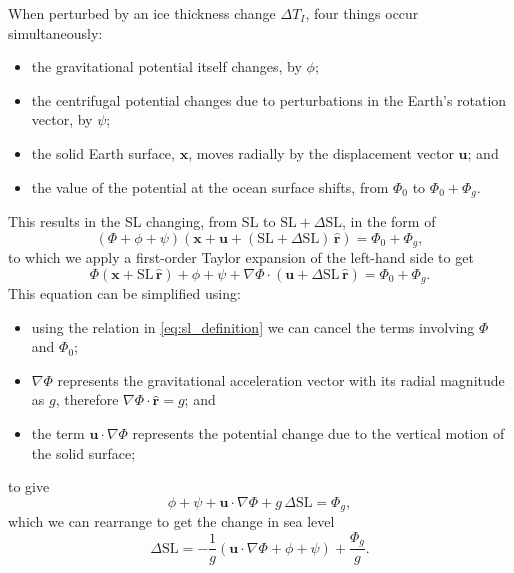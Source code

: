 When perturbed by an ice thickness change $\Delta T_I$, four things occur
simultaneously:
%
\begin{itemize}
    \item the gravitational potential itself changes, by $\phi$;
    \item the centrifugal potential changes due to perturbations in
          the Earth's rotation vector, by $\psi$;
    \item the solid Earth surface, $\mathbf{x}$, moves radially by
          the displacement vector $\mathbf{u}$; and
    \item the value of the potential at the ocean surface shifts,
          from $\Phi_0$ to $\Phi_0 + \Phi_g$.
\end{itemize}
%
This results in the SL changing, from SL to $\mathrm{SL} + \Delta\mathrm{SL}$,
in the form of
%
\begin{equation}
    \left(\Phi + \phi + \psi\right)\!\left(
        \mathbf{x} + \mathbf{u} + \left(\mathrm{SL} + \Delta\mathrm{SL}\right)\,\hat{\mathbf{r}}
    \right) = \Phi_0 + \Phi_g,
    \label{eq:sl_perturbed}
\end{equation}
%
to which we apply a first-order Taylor expansion of the left-hand side to get
%
\begin{equation}
    \Phi\left(\mathbf{x} + \mathrm{SL}\,\hat{\mathbf{r}}\right)
    + \phi + \psi
    + \nabla\Phi \cdot \left(\mathbf{u} + \Delta\mathrm{SL}\,\hat{\mathbf{r}}\right)
    = \Phi_0 + \Phi_g.
    \label{eq:sl_taylor}
\end{equation}
%
This equation can be simplified using:
%
\begin{itemize}
    \item using the relation in \autoref{eq:sl_definition} we can cancel the
          terms involving $\Phi$ and $\Phi_0$;
    \item $\nabla\Phi$ represents the gravitational acceleration vector with
          its radial magnitude as $g$, therefore
          $\nabla\Phi \cdot \hat{\mathbf{r}} = g$; and
    \item the term $\mathbf{u} \cdot \nabla\Phi$ represents the potential
          change due to the vertical motion of the solid surface;
\end{itemize}
%
to give
%
\begin{equation}
    \phi + \psi + \mathbf{u} \cdot \nabla\Phi + g\,\Delta\mathrm{SL} = \Phi_g,
    \label{eq:sl_simplified}
\end{equation}
%
which we can rearrange to get the change in sea level
%
\begin{equation}
    \Delta\mathrm{SL} = -\frac{1}{g}
        \left(\mathbf{u} \cdot \nabla\Phi + \phi + \psi\right)
        + \frac{\Phi_g}{g}.
    \label{eq:slc}
\end{equation}

